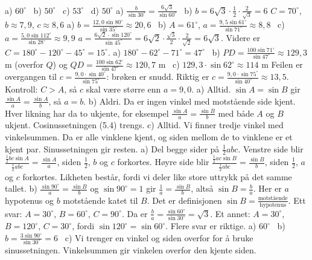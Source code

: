 
 a) $60^\circ$ \ b) $50^\circ$ \ c) $53^\circ$ \ d) $50^\circ$
 a) $\frac{b}{\sin 30^\circ} = \frac{6\sqrt3}{\sin 60^\circ}$ \ b) $b = 6\sqrt3 \cdot \frac12 \cdot \frac{2}{\sqrt3} = 6$
 $C = 70^\circ$, $b \approx 7,9$, $c \approx 8,6$
 a) $b = \frac{12,0\sin 80^\circ}{\sin 35^\circ} \approx 20,6$ \ b) $A = 61^\circ$, $a = \frac{9,5\sin 61^\circ}{\sin 71^\circ} \approx 8,8$ \ c) $a = \frac{5,0\sin 112^\circ}{\sin 28^\circ} \approx 9,9$
 $a = \frac{6\sqrt2 \cdot \sin 120^\circ}{\sin 45^\circ} = 6\sqrt2 \cdot \frac{\sqrt3}{2} \cdot \frac{2}{\sqrt2} = 6\sqrt3$. Videre er $C = 180^\circ - 120^\circ - 45^\circ = 15^\circ$.
 a) $180^\circ - 62^\circ - 71^\circ = 47^\circ$ \ b) $PD = \frac{100\sin 71^\circ}{\sin 47^\circ} \approx 129,3$ m (overfor $Q$) og $QD = \frac{100\sin 62^\circ}{\sin 47^\circ} \approx 120,7$ m \ c) $129,3 \cdot \sin 62^\circ \approx 114$ m
 Feilen er overgangen til $c = \frac{9,0\cdot\sin 40^\circ}{\sin 75^\circ}$: brøken er snudd. Riktig er $c = \frac{9,0 \cdot \sin 75^\circ}{\sin 40^\circ} \approx 13,5$. Kontroll: $C > A$, så $c$ skal være større enn $a = 9,0$.
 a) Alltid. $\sin A = \sin B$ gir $\frac{\sin A}{a} = \frac{\sin A}{b}$, så $a = b$.
b) Aldri. Da er ingen vinkel med motstående side kjent. Hver likning har da to ukjente, for eksempel $\frac{\sin A}{a} = \frac{\sin B}{b}$ med både $A$ og $B$ ukjent. Cosinussetningen (5.4) trengs.
c) Alltid. Vi finner tredje vinkel med vinkelsummen. Da er alle vinklene kjent, og siden mellom de to vinklene er et kjent par. Sinussetningen gir resten.
 a) Del begge sider på $\frac12 abc$. Venstre side blir $\frac{\frac12 bc\sin A}{\frac12 abc} = \frac{\sin A}{a}$, siden $\frac12$, $b$ og $c$ forkortes. Høyre side blir $\frac{\frac12 ac\sin B}{\frac12 abc} = \frac{\sin B}{b}$, siden $\frac12$, $a$ og $c$ forkortes. Likheten består, fordi vi deler like store uttrykk på det samme tallet.
b) $\frac{\sin 90^\circ}{a} = \frac{\sin B}{b}$ og $\sin 90^\circ = 1$ gir $\frac1a = \frac{\sin B}{b}$, altså $\sin B = \frac ba$. Her er $a$ hypotenus og $b$ motstående katet til $B$. Det er definisjonen $\sin B = \frac{\text{motstående}}{\text{hypotenus}}$.
 Ett svar: $A = 30^\circ$, $B = 60^\circ$, $C = 90^\circ$. Da er $\frac ba = \frac{\sin 60^\circ}{\sin 30^\circ} = \sqrt3$. Et annet: $A = 30^\circ$, $B = 120^\circ$, $C = 30^\circ$, fordi $\sin 120^\circ = \sin 60^\circ$. Flere svar er riktige.
 a) $60^\circ$ \ b) $b = \frac{3\sin 90^\circ}{\sin 30^\circ} = 6$ \ c) Vi trenger en vinkel og siden overfor for å bruke sinussetningen. Vinkelsummen gir vinkelen overfor den kjente siden.

